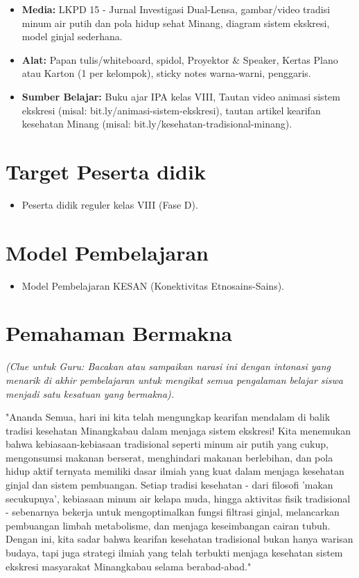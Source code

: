 \documentclass[a4paper,12pt]{article}
\begin{document}
\begin{itemize}
\item \textbf{Media:} LKPD 15 - Jurnal Investigasi Dual-Lensa, gambar/video tradisi minum air putih dan pola hidup sehat Minang, diagram sistem ekskresi, model ginjal sederhana.
\item \textbf{Alat:} Papan tulis/whiteboard, spidol, Proyektor \& Speaker, Kertas Plano atau Karton (1 per kelompok), sticky notes warna-warni, penggaris.
\item \textbf{Sumber Belajar:} Buku ajar IPA kelas VIII, Tautan video animasi sistem ekskresi (misal: bit.ly/animasi-sistem-ekskresi), tautan artikel kearifan kesehatan Minang (misal: bit.ly/kesehatan-tradisional-minang).
\end{itemize}

\section{Target Peserta didik}

\begin{itemize}
\item Peserta didik reguler kelas VIII (Fase D).
\end{itemize}

\section{Model Pembelajaran}

\begin{itemize}
\item Model Pembelajaran KESAN (Konektivitas Etnosains-Sains).
\end{itemize}

\section{Pemahaman Bermakna}
\textit{(Clue untuk Guru: Bacakan atau sampaikan narasi ini dengan intonasi yang menarik di akhir pembelajaran untuk mengikat semua pengalaman belajar siswa menjadi satu kesatuan yang bermakna).}

\begin{tcolorbox}[sectionbox]
"Ananda Semua, hari ini kita telah mengungkap kearifan mendalam di balik tradisi kesehatan Minangkabau dalam menjaga sistem ekskresi! Kita menemukan bahwa kebiasaan-kebiasaan tradisional seperti minum air putih yang cukup, mengonsumsi makanan berserat, menghindari makanan berlebihan, dan pola hidup aktif ternyata memiliki dasar ilmiah yang kuat dalam menjaga kesehatan ginjal dan sistem pembuangan. Setiap tradisi kesehatan - dari filosofi 'makan secukupnya', kebiasaan minum air kelapa muda, hingga aktivitas fisik tradisional - sebenarnya bekerja untuk mengoptimalkan fungsi filtrasi ginjal, melancarkan pembuangan limbah metabolisme, dan menjaga keseimbangan cairan tubuh. Dengan ini, kita sadar bahwa kearifan kesehatan tradisional bukan hanya warisan budaya, tapi juga strategi ilmiah yang telah terbukti menjaga kesehatan sistem ekskresi masyarakat Minangkabau selama berabad-abad."
\end{tcolorbox}
\end{document}
